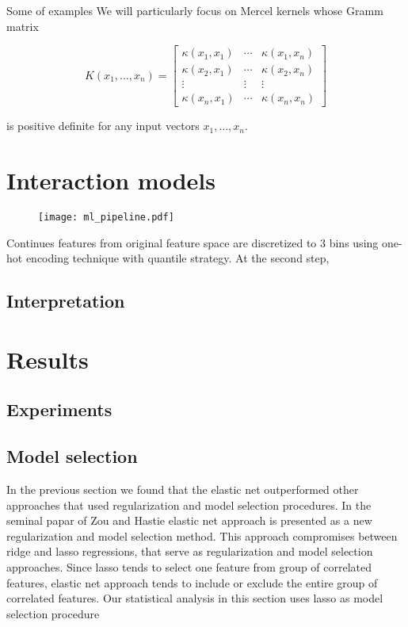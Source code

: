 \documentclass{article}
\begin{document}
Some of examples We will particularly focus on Mercel kernels whose Gramm matrix 

\begin{equation}
  K(x_1,\ldots,x_n) = \left[\begin{array}{ccc}
    \kappa(x_1,x_1)& \cdots & \kappa(x_1,x_n)\\
    \kappa(x_2,x_1)& \cdots & \kappa(x_2,x_n)\\
    \vdots & \vdots & \vdots\\
    \kappa(x_n,x_1)& \cdots & \kappa(x_n,x_n)
  \end{array}\right]
\end{equation}

is positive definite for any input vectors $x_1,\ldots,x_n$.



\section{Interaction models}


\begin{figure}
  \texttt{[image: ml\_pipeline.pdf]}
\end{figure}

Continues features from original feature space are discretized to $3$ bins using one-hot encoding technique with quantile strategy. At the second step,  

\subsection{Interpretation}



\section{Results}


\subsection{Experiments}

\subsection{Model selection}
In the  previous section we found that the elastic net outperformed other approaches that used regularization and model selection procedures. In the seminal papar of Zou and Hastie elastic net approach is presented as  a new regularization and model selection method. This approach compromises between ridge and lasso regressions, that serve as regularization and model selection approaches. Since lasso tends to select one feature from group of correlated features, elastic net approach tends to include or exclude the entire group of correlated features. Our statistical analysis in this section uses lasso as model selection procedure 
\end{document}
